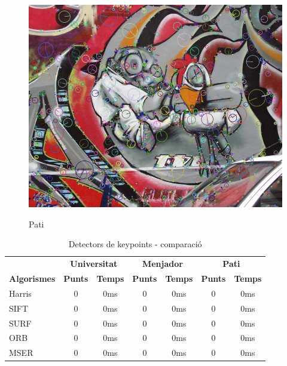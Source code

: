\begin{figure}[!htb]
				\includegraphics[width=\linewidth]{images/RobotKp}
				\label{fig:awesome_image3}
			\endminipage
			\caption{Pati}
		\end{figure}

		\begin{table}[H]
			\begin{center}
				\begin{tabular}{l | c c | c c | c c}
					& \multicolumn{2}{c|}{\textbf{Universitat}} & \multicolumn{2}{c|}{\textbf{Menjador}} & \multicolumn{2}{c}{\textbf{Pati}} \\
					\textbf{Algorismes} & \textbf{Punts} & \textbf{Temps} & \textbf{Punts} & \textbf{Temps} & \textbf{Punts} & \textbf{Temps} \\ \hline
					Harris & 0 & 0ms & 0 & 0ms & 0 & 0ms \\
					SIFT & 0 & 0ms & 0 & 0ms & 0 & 0ms \\
					SURF & 0 & 0ms & 0 & 0ms & 0 & 0ms \\
					ORB & 0 & 0ms & 0 & 0ms & 0 & 0ms \\
					MSER & 0 & 0ms & 0 & 0ms & 0 & 0ms \\
				\end{tabular}
			\end{center}
			\caption{Detectors de keypoints - comparació}
		\end{table}
\newpage
